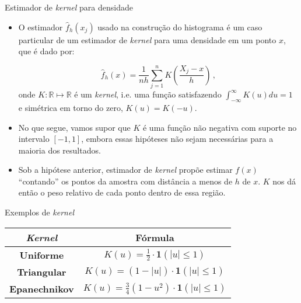 \documentclass[11pt]{beamer}
\begin{document}
	\begin{frame}{Estimador de \textit{kernel} para densidade}
		\begin{itemize}
			\item O estimador $\hat{f}_h(x_j)$ usado na construção do histograma é um caso particular de um {\color{blue}estimador de \textit{kernel}} para uma densidade em um ponto $x$, que é dado por:
			
			$$\hat{f}_h(x) = \frac{1}{nh}\sum_{j=1}^n K\left(\frac{X_j - x}{h}\right) \, ,$$
			onde $K:\mathbb{R}\mapsto \mathbb{R}$ é um \textit{kernel}, i.e. uma função satisfazendo $\int_{-\infty}^\infty K(u) du = 1$ e simétrica em torno do zero, $K(u) = K(-u)$.
			\item No que segue, vamos supor que $K$ é uma função não negativa com suporte no intervalo $[-1,1]$, embora essas hipóteses não sejam necessárias para a maioria dos resultados.
			\item Sob a hipótese anterior, estimador de \textit{kernel} propõe estimar $f(x)$ ``contando'' os pontos da amostra com distância a menos de $h$ de $x$. $K$ nos dá então o peso relativo de cada ponto dentro de essa região.
		\end{itemize}
	\end{frame}
	\begin{frame}{Exemplos de \textit{kernel}}
		\begin{table}[h!]
			\centering
			\begin{tabular}{|c|c|}
				\hline
				\textbf{\textit{Kernel}}         & \textbf{Fórmula}                                      \\ \hline
				\textbf{Uniforme}        & $K(u) = \frac{1}{2} \cdot \mathbf{1}(|u| \leq 1)$     \\ \hline
				\textbf{Triangular}     & $K(u) = (1 - |u|) \cdot \mathbf{1}(|u| \leq 1)$       \\ \hline
				\textbf{Epanechnikov}   & $K(u) = \frac{3}{4}(1 - u^2) \cdot \mathbf{1}(|u| \leq 1)$ \\ \hline
			\end{tabular}
		\end{table}
	
	\end{frame}
\end{document}
